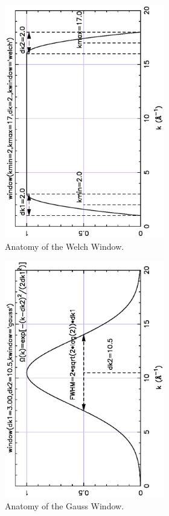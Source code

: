 \begin{figure}[tb] \begin{center}
  \includegraphics[width=2.75in,angle=-90]{figs/win_welch.ps}
  \caption{ Anatomy of the Welch Window.}\label{Fig:WinWelch}
\end{center} \end{figure}

\begin{figure}[tb] \begin{center}
  \includegraphics[width=2.75in,angle=-90]{figs/win_gauss.ps}
  \caption{ Anatomy of the Gauss Window.}\label{Fig:WinGauss}
\end{center} \end{figure}

